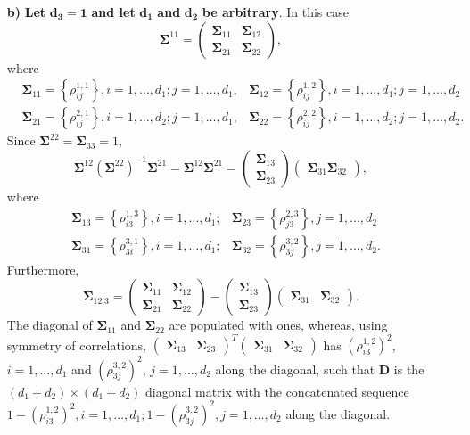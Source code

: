 \documentclass[
  12pt,
  letterpaper]{article}
\numberwithin{equation}{section}
\newcommand{\D}{\bm{D}}
\newcommand{\fSigma}{\bm{\Sigma}}
\begin{document}
\begin{itemize}
\item[\textbf{b)}] \textbf{Let} $\bm{d_3=1}$ \textbf{and let} $\bm{d_1}$ \textbf{and} $\bm{d_2}$ \textbf{be arbitrary}. In this case 
$$\fSigma^{11} = \begin{pmatrix} \fSigma_{11} & \fSigma_{12} \\ \fSigma_{21} & \fSigma_{22}\end{pmatrix},$$
where
\begin{align*}
&\fSigma_{11} = \left\{ \rho_{ij}^{1,1} \right\}, i = 1, \ldots, d_1; j = 1, \ldots, d_1,   &\fSigma_{12} = \left\{ \rho_{ij}^{1,2} \right\}, i = 1, \ldots, d_1; j = 1, \ldots, d_2 \\
&\fSigma_{21} = \left\{ \rho_{ij}^{2,1} \right\}, i = 1, \ldots, d_2; j = 1, \ldots, d_1,   &\fSigma_{22} = \left\{ \rho_{ij}^{2,2} \right\}, i = 1, \ldots, d_2; j = 1, \ldots, d_2.
\end{align*}
Since $\fSigma^{22} = \fSigma_{33} = 1,$
$$\fSigma^{12}\left(\fSigma^{22}\right)^{-1}\fSigma^{21} = \fSigma^{12}\fSigma^{21} = \begin{pmatrix} \fSigma_{13} \\ \fSigma_{23} \end{pmatrix} \begin{pmatrix}\fSigma_{31} \fSigma_{32} \end{pmatrix},$$
where 
\begin{align*}
&\fSigma_{13} = \left\{ \rho_{i3}^{1,3} \right\}, i = 1, \ldots, d_1;   &\fSigma_{23} = \left\{ \rho_{j3}^{2,3} \right\}, j = 1, \ldots, d_2 \\
&\fSigma_{31} = \left\{ \rho_{3i}^{3,1} \right\}, i = 1, \ldots, d_1;   &\fSigma_{32} = \left\{ \rho_{3j}^{3,2} \right\}, j = 1, \ldots, d_2.
\end{align*}
Furthermore, 
$$\fSigma_{12|3} = \begin{pmatrix}\fSigma_{11} & \fSigma_{12} \\ \fSigma_{21} & \fSigma_{22}\end{pmatrix} - \begin{pmatrix} \fSigma_{13} \\ \fSigma_{23}\end{pmatrix}\begin{pmatrix} \fSigma_{31} & \fSigma_{32}\end{pmatrix}.$$
The diagonal of $\fSigma_{11}$ and $\fSigma_{22}$ are populated with ones, whereas, using symmetry of correlations, $\begin{pmatrix} \fSigma_{13} & \fSigma_{23}\end{pmatrix}^T\begin{pmatrix} \fSigma_{31} & \fSigma_{32}\end{pmatrix}$ has $\left(\rho_{i3}^{1,2}\right)^2$, $i=1,\ldots,d_1$ and $\left(\rho_{3j}^{3,2}\right)^2$, $j=1,\ldots,d_2$ along the diagonal, such that $\D$ is the $(d_1+d_2)\times(d_1+d_2)$ diagonal matrix with the concatenated sequence $1-\left(\rho_{i3}^{1,2}\right)^2, i=1,\ldots,d_1; 1- \left(\rho_{3j}^{3,2}\right)^2, j=1,\ldots,d_2$ along the diagonal.


\end{itemize}
\end{document}
